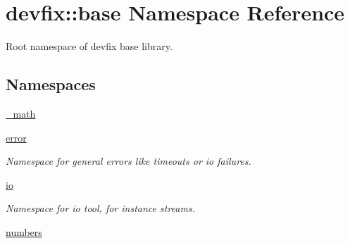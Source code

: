 \hypertarget{namespacedevfix_1_1base}{}\section{devfix\+:\+:base Namespace Reference}
\label{namespacedevfix_1_1base}


Root namespace of devfix base library.  


\subsection*{Namespaces}
\begin{DoxyCompactItemize}
\item 
 \hyperlink{namespacedevfix_1_1base_1_1__math}{\+\_\+math}
\item 
 \hyperlink{namespacedevfix_1_1base_1_1error}{error}
\begin{DoxyCompactList}\small\item\em Namespace for general errors like timeouts or io failures. \end{DoxyCompactList}\item 
 \hyperlink{namespacedevfix_1_1base_1_1io}{io}
\begin{DoxyCompactList}\small\item\em Namespace for io tool, for instance streams. \end{DoxyCompactList}\item 
 \hyperlink{namespacedevfix_1_1base_1_1numbers}{numbers}
\end{DoxyCompactItemize}
